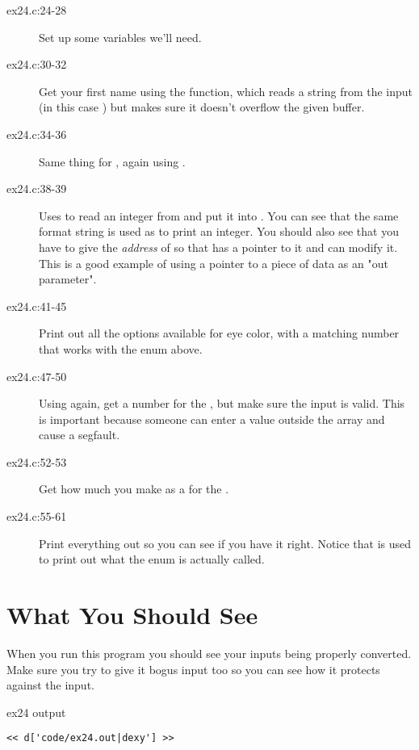 \begin{description}
\item[ex24.c:24-28] Set up some variables we'll need.
\item[ex24.c:30-32] Get your first name using the  function, which reads a
    string from the input (in this case ) but makes sure it
    doesn't overflow the given buffer.
\item[ex24.c:34-36] Same thing for , again using .
\item[ex24.c:38-39] Uses  to read an integer from  and put it
    into .  You can see that the same format string is used
    as  to print an integer.  You should also see that you have
    to give the \emph{address} of  so that  has
    a pointer to it and can modify it.  This is a good example of using a
    pointer to a piece of data as an "out parameter".
\item[ex24.c:41-45] Print out all the options available for eye color, with a matching
    number that works with the  enum above.
\item[ex24.c:47-50] Using  again, get a number for the , 
    but make sure the input is valid.  This is important because someone can
    enter a value outside the  array and cause a 
    segfault.
\item[ex24.c:52-53] Get how much you make as a  for the .
\item[ex24.c:55-61] Print everything out so you can see if you have it right.  Notice
    that  is used to print out what the 
    enum is actually called.
\end{description}


\section{What You Should See}

When you run this program you should see your inputs being properly converted.
Make sure you try to give it bogus input too so you can see how it protects
against the input.

\begin{code}{ex24 output}
\begin{lstlisting}
<< d['code/ex24.out|dexy'] >>
\end{lstlisting}
\end{code}



